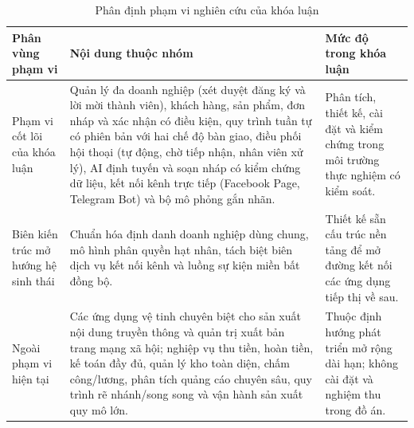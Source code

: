 \begin{table}[htbp]
  \centering
  \small
  \setlength{\tabcolsep}{4pt}
  \renewcommand{\arraystretch}{1.2}
  \caption{Phân định phạm vi nghiên cứu của khóa luận}\label{tab:scope-boundary}
  \begin{tabularx}{\linewidth}{@{}
    >{\raggedright\arraybackslash}p{3.4cm}
    >{\raggedright\arraybackslash}X
    >{\raggedright\arraybackslash}p{3.8cm}@{}}
    \toprule
    Phân vùng phạm vi & Nội dung thuộc nhóm & Mức độ trong khóa luận \\
    \midrule
    Phạm vi cốt lõi của khóa luận &
    Quản lý đa doanh nghiệp (xét duyệt đăng ký và lời mời thành viên), khách hàng, sản phẩm, đơn nháp và xác nhận có điều kiện, quy trình tuần tự có phiên bản với hai chế độ bàn giao, điều phối hội thoại (tự động, chờ tiếp nhận, nhân viên xử lý), AI định tuyến và soạn nháp có kiểm chứng dữ liệu, kết nối kênh trực tiếp (Facebook Page, Telegram Bot) và bộ mô phỏng gắn nhãn. &
    Phân tích, thiết kế, cài đặt và kiểm chứng trong môi trường thực nghiệm có kiểm soát. \\
    Biên kiến trúc mở hướng hệ sinh thái &
    Chuẩn hóa định danh doanh nghiệp dùng chung, mô hình phân quyền hạt nhân, tách biệt biên dịch vụ kết nối kênh và luồng sự kiện miền bất đồng bộ. &
    Thiết kế sẵn cấu trúc nền tảng để mở đường kết nối các ứng dụng tiếp thị về sau. \\
    Ngoài phạm vi hiện tại &
    Các ứng dụng vệ tinh chuyên biệt cho sản xuất nội dung truyền thông và quản trị xuất bản trang mạng xã hội; nghiệp vụ thu tiền, hoàn tiền, kế toán đầy đủ, quản lý kho toàn diện, chấm công/lương, phân tích quảng cáo chuyên sâu, quy trình rẽ nhánh/song song và vận hành sản xuất quy mô lớn. &
    Thuộc định hướng phát triển mở rộng dài hạn; không cài đặt và nghiệm thu trong đồ án. \\
    \bottomrule
  \end{tabularx}
\end{table}


